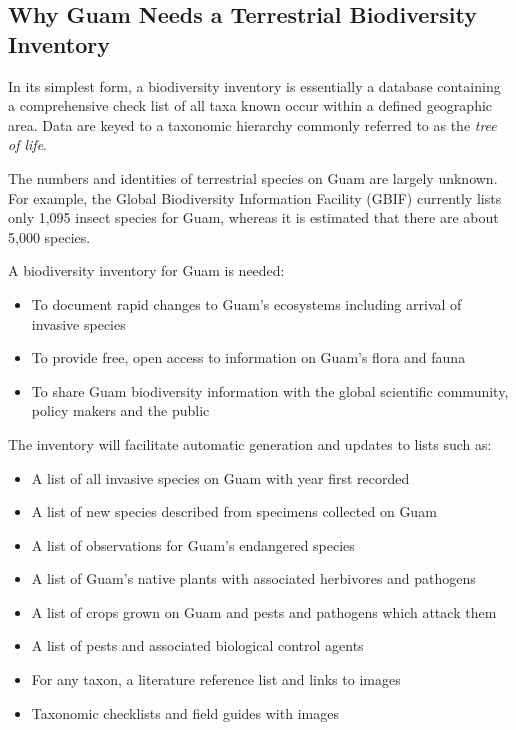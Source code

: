 \documentclass[12pt,letterpaper,english,bibliography=totocnumbered, abstract=on]{scrartcl}
\begin{document}
\subsection{Why Guam Needs a Terrestrial Biodiversity Inventory}

In its simplest form, a biodiversity inventory is essentially a database containing a comprehensive check list of all taxa known occur within a defined geographic area. Data are keyed to a taxonomic hierarchy commonly referred to as the \textit{tree of life}. 

The numbers and identities of terrestrial species on Guam are largely unknown. For example, the Global Biodiversity Information Facility (GBIF) currently lists only 1,095 insect species for Guam, whereas it is estimated that there are about 5,000 species.

A biodiversity inventory for Guam is needed:

\begin{itemize}
	\item To document rapid changes to Guam’s ecosystems including arrival of invasive species
	\item To provide free, open access to information on Guam’s flora and fauna
	\item To share Guam biodiversity information with the global scientific community, policy makers and the public
\end{itemize}

The inventory will facilitate automatic generation and updates to lists such as:
\begin{itemize}
	\item A list of all invasive species on Guam with year first recorded
	\item A list of new species described from specimens collected on Guam
	\item A list of observations for Guam’s endangered species
	\item A list of Guam’s native plants with associated herbivores and pathogens
	\item A list of crops grown on Guam and pests and pathogens which attack them
	\item A list of pests and associated biological control agents
	\item For any taxon, a literature reference list and links to images
	\item Taxonomic checklists and field guides with images
\end{itemize}
\end{document}
